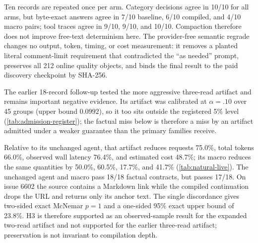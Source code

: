 Ten records are repeated once per arm.  Category decisions agree in 10/10 for all arms,
but byte-exact answers agree in 7/10 baseline, 6/10 compiled, and 4/10 macro pairs; tool
traces agree in 9/10, 9/10, and 10/10.  Compaction therefore does not improve free-text
determinism here.  The provider-free semantic regrade changes no output, token, timing, or
cost measurement: it removes a planted literal comment-limit requirement that contradicted
the ``as needed'' prompt, preserves all 212 online quality objects, and binds the final
result to the paid discovery checkpoint by SHA-256.

The earlier 18-record follow-up tested the more aggressive three-read artifact and remains
important negative evidence.  Its artifact was calibrated at $\alpha=.10$ over 45 groups
(upper bound $0.0992$), so it too sits outside the registered 5\% level
(\cref{tab:admission-register}); the factual miss below is therefore a miss by an artifact
admitted under a weaker guarantee than the primary families receive.

\begin{table}[t]
  \centering
  \caption{The earlier free-order 18-record follow-up, in which \method compiled the more
  aggressive three-read region.  Means are per issue over 18 held-out pairs with all six
  condition orders balanced three times.  This is the artifact calibrated at
  $\alpha=.10$, not one of the primary families, and it is the arm that records the single
  factual miss discussed below.}
  \label{tab:natural-live}
  \small
  
\end{table}

Relative to its unchanged agent, that artifact reduces requests 75.0\%, total tokens
66.0\%, observed wall latency 76.4\%, and estimated cost 48.7\%; its macro reduces the
same quantities by 50.0\%, 60.5\%, 17.7\%, and 41.7\% (\cref{tab:natural-live}).  The
unchanged agent and macro pass 18/18 factual contracts, but \method passes 17/18.  On issue 6602 the source contains a
Markdown link while the compiled continuation drops the URL and returns only its anchor
text.  The single discordance gives two-sided exact McNemar $p=1$ and a one-sided 95\%
exact upper bound of 23.8\%.  H3 is therefore supported as an observed-sample result for
the expanded two-read artifact and not supported for the earlier three-read artifact;
preservation is not invariant to compilation depth.

